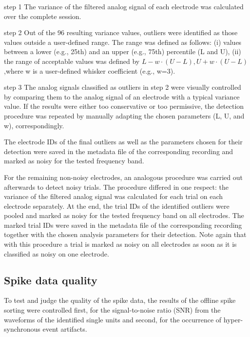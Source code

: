 {step 1 The variance of the filtered analog signal of each electrode was calculated over the complete session. 

step 2 Out of the 96 resulting variance values, outliers were identified as those values outside a user-defined range. The range was defined as follows: (i) values between a lower (e.g., 25th) and an upper (e.g., 75th) percentile (L and U), (ii) the range of acceptable values was defined by $L-w\cdot(U-L),U+w\cdot(U-L)$,where w is a user-defined whisker coefficient (e.g., w=3). 

step 3 The analog signals classified as outliers in step 2 were visually controlled by comparing them to the analog signal of an electrode with a typical variance value. If the results were either too conservative or too permissive, the detection procedure was repeated by manually adapting the chosen parameters (L, U, and w), correspondingly. 

The electrode IDs of the final outliers as well as the parameters chosen for their detection were saved in the  metadata file of the corresponding recording and marked as noisy for the tested frequency band. 

For the remaining non-noisy electrodes, an analogous procedure was carried out afterwards to detect noisy trials. The procedure differed in one respect: the variance of the filtered analog signal was calculated for each trial on each electrode separately. At the end, the trial IDs of the identified outliers were pooled and marked as noisy for the tested frequency band on all electrodes. The marked trial IDs were saved in the  metadata file of the corresponding recording together with the chosen analysis parameters for their detection. Note again that with this procedure a trial is marked as noisy on all electrodes as soon as it is classified as noisy on one electrode.

\subsection{Spike data quality}
\label{sec:spike_data_quality}

To test and judge the quality of the spike data, the results of the offline spike sorting were controlled first, for the signal-to-noise ratio (SNR) from the waveforms of the identified single units and second, for the occurrence of hyper-synchronous event artifacts.

}
